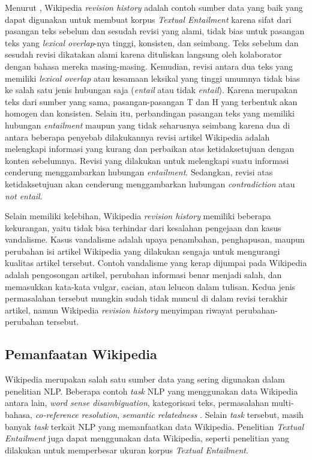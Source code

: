 Menurut \cite{zanzottoRTEexpand}, Wikipedia \textit{revision history} adalah contoh sumber data yang baik yang dapat digunakan untuk membuat korpus \textit{Textual Entailment} karena sifat dari pasangan teks sebelum dan sesudah revisi yang alami, tidak bias untuk pasangan teks yang \textit{lexical overlap}-nya tinggi, konsisten, dan seimbang. Teks sebelum dan sesudah revisi dikatakan alami karena dituliskan langsung oleh kolaborator dengan bahasa mereka masing-masing. Kemudian, revisi antara dua teks yang memiliki \textit{lexical overlap} atau kesamaan leksikal yang tinggi umumnya tidak bias ke salah satu jenis hubungan saja (\textit{entail} atau tidak \textit{entail}). Karena merupakan teks dari sumber yang sama, pasangan-pasangan T dan H yang terbentuk akan homogen dan konsisten. Selain itu, perbandingan pasangan teks yang memiliki hubungan \textit{entailment} maupun yang tidak seharusnya seimbang karena dua di antara beberapa penyebab dilakukannya revisi artikel Wikipedia adalah melengkapi informasi yang kurang dan perbaikan atas ketidaksetujuan dengan konten sebelumnya. Revisi yang dilakukan untuk melengkapi suatu informasi cenderung menggambarkan hubungan \textit{entailment}. Sedangkan, revisi atas ketidaksetujuan akan cenderung menggambarkan hubungan \textit{contradiction} atau \textit{not entail}.

Selain memiliki kelebihan, Wikipedia \textit{revision history} memiliki beberapa kekurangan, yaitu tidak bisa terhindar dari kesalahan pengejaan dan kasus vandalisme. Kasus vandalisme adalah upaya penambahan, penghapusan, maupun perubahan isi artikel Wikipedia yang dilakukan sengaja untuk mengurangi kualitas artikel tersebut. Contoh vandalisme yang kerap dijumpai pada Wikipedia adalah pengosongan artikel, perubahan informasi benar menjadi salah, dan memasukkan kata-kata vulgar, cacian, atau lelucon dalam tulisan. Kedua jenis permasalahan tersebut mungkin sudah tidak muncul di dalam revisi terakhir artikel, namun Wikipedia \textit{revision history} menyimpan riwayat perubahan-perubahan tersebut.

\subsection{Pemanfaatan Wikipedia}
Wikipedia merupakan salah satu sumber data yang sering digunakan dalam penelitian NLP. Beberapa contoh \textit{task} NLP yang menggunakan data Wikipedia antara lain, \textit{word sense disambiguation}, kategorisasi teks, permasalahan multi-bahasa, \textit{co-reference resolution}, \textit{semantic relatedness} \citep{Medelyan:2009:MMW:1618876.1619040}. Selain \textit{task} tersebut, masih banyak \textit{task} terkait NLP yang memanfaatkan data Wikipedia. Penelitian \textit{Textual Entailment} juga dapat menggunakan data Wikipedia, seperti penelitian yang dilakukan \cite{zanzottoRTEexpand} untuk memperbesar ukuran korpus \textit{Textual Entailment}.

